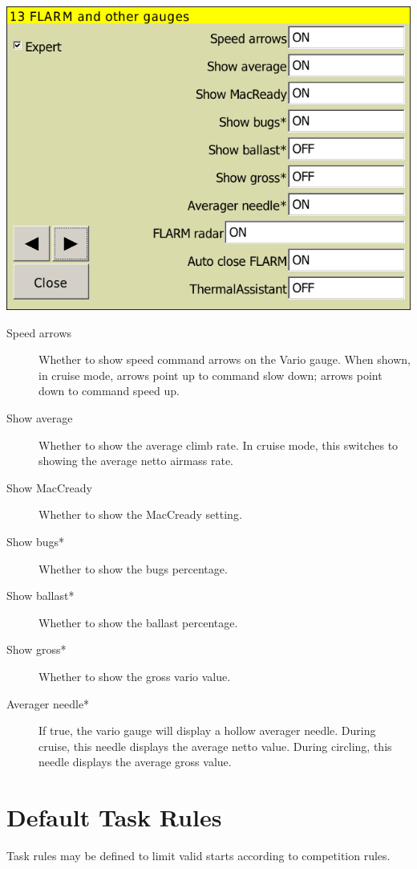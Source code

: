 \begin{center}
\includegraphics[angle=0,width=0.8\linewidth,keepaspectratio='true']{figures/config-othergauges.png}
\end{center}
\label{conf:variogauge}
\begin{description}
\item[Speed arrows]  Whether to show speed command arrows on the Vario gauge.
When shown, in cruise mode, arrows point up to command slow down; arrows point down to command speed up.
\item[Show average]  Whether to show the average climb rate.  In cruise mode, this switches to showing the average 
netto airmass rate.
\item[Show MacCready]  Whether to show the MacCready setting.
\item[Show bugs*]  Whether to show the bugs percentage.
\item[Show ballast*]  Whether to show the ballast percentage.
\item[Show gross*]  Whether to show the gross vario value.
\item[Averager needle*]  If true, the vario gauge will display a hollow averager
needle.  During cruise, this needle displays the average netto value.  During circling, this needle displays the average gross value.
\end{description}


\clearpage
\section{Default Task Rules}
Task rules may be defined to limit valid starts according to competition
rules. \label{conf:taskrules}

